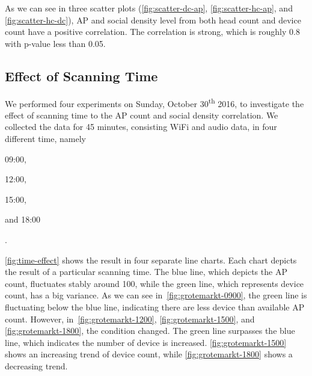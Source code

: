 	As we can see in three scatter plots (\autoref{fig:scatter-dc-ap}, \autoref{fig:scatter-hc-ap}, and \autoref{fig:scatter-hc-dc}), \ac{AP} and social density level from both head count and device count have a positive correlation. The correlation is strong, which is roughly 0.8 with p-value less than 0.05. 






	\subsection{Effect of Scanning Time} %
	\label{sub:effect_of_scanning_time}
	We performed four experiments on Sunday, October 30\textsuperscript{th} 2016, to investigate the effect of scanning time to the \ac{AP} count and social density correlation. We collected the data for 45 minutes, consisting WiFi and audio data, in four different time, namely
	\begin{enumerate*}[label={\alph*)},font={\color{red!50!black}\bfseries}]
	  \item 09:00,
	  \item 12:00,
	  \item 15:00,
	  \item and 18:00
	\end{enumerate*}.
	
	\autoref{fig:time-effect} shows the result in four separate line charts. Each chart depicts the result of a particular scanning time. The blue line, which depicts the \ac{AP} count, fluctuates stably around 100, while the green line, which represents device count, has a big variance. As we can see in~\autoref{fig:grotemarkt-0900}, the green line is fluctuating below the blue line, indicating there are less device than available \ac{AP} count. However, in~\autoref{fig:grotemarkt-1200}, \autoref{fig:grotemarkt-1500}, and \autoref{fig:grotemarkt-1800}, the condition changed. The green line surpasses the blue line, which indicates the number of device is increased. \autoref{fig:grotemarkt-1500} shows an increasing trend of device count, while \autoref{fig:grotemarkt-1800} shows a decreasing trend.

